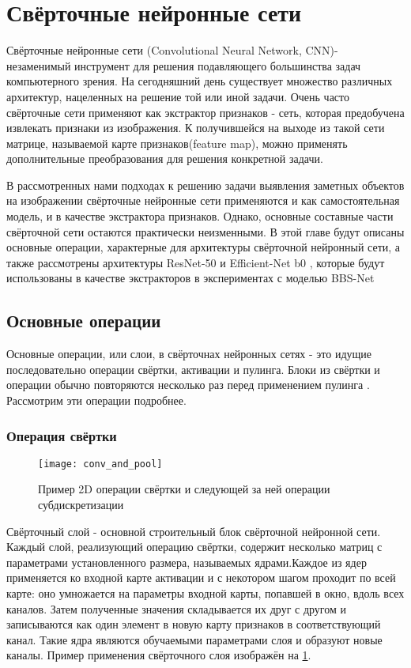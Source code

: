 \section{Свёрточные нейронные сети}


Свёрточные нейронные сети (Convolutional Neural Network, CNN)- незаменимый инструмент для решения подавляющего большинства задач компьютерного зрения. 
На сегодняшний день существует множество различных архитектур, нацеленных на решение той или иной задачи. 
Очень часто свёрточные сети применяют как экстрактор признаков - сеть, которая предобучена извлекать признаки из изображения. К получившейся 
на выходе из такой сети матрице, называемой карте признаков(feature map), можно применять дополнительные преобразования для решения конкретной задачи. 

В рассмотренных нами подходах к решению задачи выявления заметных объектов на изображении свёрточные нейронные сети 
применяются и как самостоятельная модель, и в качестве экстрактора признаков. Однако, основные составные части свёрточной сети 
остаются практически неизменными. В этой главе будут описаны основные операции, характерные для архитектуры свёрточной нейронный сети,
а также рассмотрены архитектуры ResNet-50\cite{ResNet} и Efficient-Net b0 \cite{Efficientnet}, которые будут использованы в качестве 
экстракторов в экспериментах с моделью BBS-Net \cite{BBS}


\subsection{Основные операции}
Основные операции, или слои, в свёрточнах нейронных сетях - это идущие последовательно операции свёртки, активации и пулинга. Блоки из свёртки и операции
обычно повторяются несколько раз перед применением пулинга \cite{ResNet}. Рассмотрим эти операции подробнее.

\subsubsection{Операция свёртки}

\begin{figure}[h]
    \centering
    \texttt{[image: conv\_and\_pool]}
    \caption{Пример 2D операции свёртки и следующей за ней операции субдискретизации}
    \label{fig:conv}
\end{figure}


Свёрточный слой - основной строительный блок свёрточной нейронной сети. Каждый слой, реализующий операцию свёртки,
содержит несколько матриц с параметрами установленного размера, называемых ядрами.Каждое из ядер применяется ко входной карте 
активации и с некотором шагом проходит по всей карте: оно умножается на параметры входной карты, попавшей в окно, вдоль всех каналов.
Затем полученные значения складывается их друг с другом и записываются как один элемент в новую карту признаков в соответствующий канал. 
Такие ядра являются обучаемыми параметрами слоя и образуют новые каналы.
Пример применения свёрточного слоя изображён на \ref{fig:conv}.


